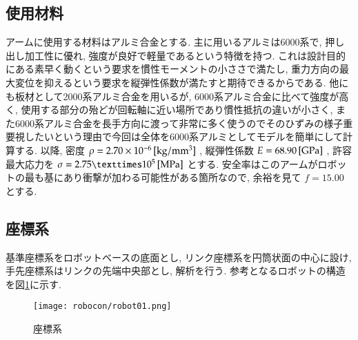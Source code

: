 \documentclass[10pt,b5paper,papersize,dvipdfmx]{jsbook}
\begin{document}
\subsection{使用材料}
アームに使用する材料はアルミ合金とする. 主に用いるアルミは6000系で, 押し出し加工性に優れ, 強度が良好で軽量であるという特徴を持つ. これは設計目的にある素早く動くという要求を慣性モーメントの小ささで満たし, 重力方向の最大変位を抑えるという要求を縦弾性係数が満たすと期待できるからである. 他にも板材として2000系アルミ合金を用いるが, 6000系アルミ合金に比べて強度が高く, 使用する部分の殆どが回転軸に近い場所であり慣性抵抗の違いが小さく, また6000系アルミ合金を長手方向に渡って非常に多く使うのでそのひずみの様子重要視したいという理由で今回は全体を6000系アルミとしてモデルを簡単にして計算する. 以降, 密度 $\rho=2.70\times 10^{-6}\tani*{kg/mm^3}$ , 縦弾性係数 $E=68.90 \tani*{GPa}$ , 許容最大応力を $\sigma=2.75×10^{5} \tani*{MPa}$ とする. 安全率はこのアームがロボットの最も基にあり衝撃が加わる可能性がある箇所なので, 余裕を見て $f=15.00$ とする.
\subsection{座標系}\label{座標系}
基準座標系をロボットベースの底面とし, リンク座標系を円筒状面の中心に設け, 手先座標系はリンクの先端中央部とし, 解析を行う. 参考となるロボットの構造を図\ref{fig:座標系}に示す. 
\begin{figure}[H]
  \centering
  \texttt{[image: robocon/robot01.png]}
  \caption{座標系}
  \label{fig:座標系}
\end{figure}
\end{document}
